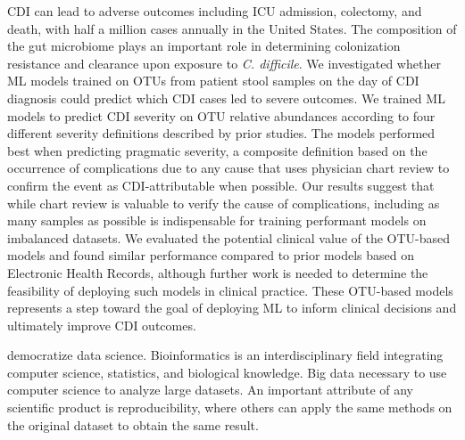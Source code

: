 CDI can lead to adverse outcomes including ICU admission, colectomy, and death,
with half a million cases annually in the United States. The composition of the
gut microbiome plays an important role in determining colonization resistance
and clearance upon exposure to \textit{C. difficile}.
We investigated whether ML models trained on OTUs from patient stool samples on
the day of CDI diagnosis could predict which CDI cases led to severe outcomes.
We trained ML models to predict CDI severity on OTU relative abundances
according to four different severity definitions described by prior studies.
The models performed best when predicting pragmatic severity, a composite
definition based on the occurrence of complications due to any cause that uses
physician chart review to confirm the event as CDI-attributable when possible.
Our results suggest that while chart review is valuable to verify the cause of
complications, including as many samples as possible is indispensable for
training performant models on imbalanced datasets.
We evaluated the potential clinical value of the OTU-based models and found
similar performance compared to prior models based on Electronic Health Records,
although further work is needed to determine the feasibility of deploying such
models in clinical practice.
These OTU-based models represents a step toward the goal of deploying ML to
inform clinical decisions and ultimately improve CDI outcomes.

democratize data science.
Bioinformatics is an interdisciplinary field integrating computer science,
statistics, and biological knowledge.
Big data necessary to use computer science to analyze large datasets.
An important attribute of any scientific product is reproducibility, where
others can apply the same methods on the original dataset to obtain the same result.